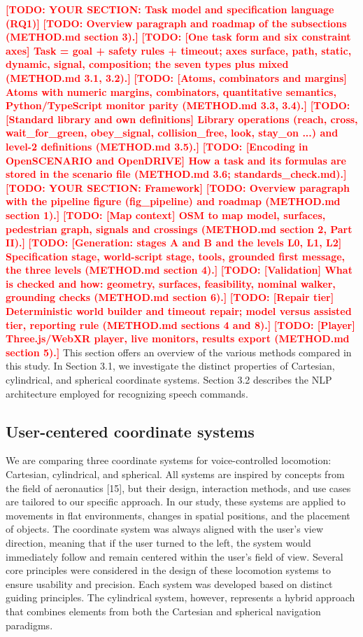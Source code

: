 \documentclass[preprint,12pt]{elsarticle}
\newcommand{\reftext}[1]{{\color{gray}#1}}   %
\newcommand{\todo}[1]{\textcolor{red}{\textbf{[TODO: #1]}}}
\begin{document}
\todo{YOUR SECTION: Task model and specification language (RQ1)}
\todo{Overview paragraph and roadmap of the subsections (METHOD.md section 3).}
\todo{[One task form and six constraint axes] Task = goal + safety rules + timeout; axes surface, path, static, dynamic, signal, composition; the seven types plus mixed (METHOD.md 3.1, 3.2).}
\todo{[Atoms, combinators and margins] Atoms with numeric margins, combinators, quantitative semantics, Python/TypeScript monitor parity (METHOD.md 3.3, 3.4).}
\todo{[Standard library and own definitions] Library operations (reach, cross, wait\_for\_green, obey\_signal, collision\_free, look, stay\_on ...) and level-2 definitions (METHOD.md 3.5).}
\todo{[Encoding in OpenSCENARIO and OpenDRIVE] How a task and its formulas are stored in the scenario file (METHOD.md 3.6; standards\_check.md).}
\todo{YOUR SECTION: Framework}
\todo{Overview paragraph with the pipeline figure (fig\_pipeline) and roadmap (METHOD.md section 1).}
\todo{[Map context] OSM to map model, surfaces, pedestrian graph, signals and crossings (METHOD.md section 2, Part II).}
\todo{[Generation: stages A and B and the levels L0, L1, L2] Specification stage, world-script stage, tools, grounded first message, the three levels (METHOD.md section 4).}
\todo{[Validation] What is checked and how: geometry, surfaces, feasibility, nominal walker, grounding checks (METHOD.md section 6).}
\todo{[Repair tier] Deterministic world builder and timeout repair; model versus assisted tier, reporting rule (METHOD.md sections 4 and 8).}
\todo{[Player] Three.js/WebXR player, live monitors, results export (METHOD.md section 5).}
\reftext{This section offers an overview of the various methods compared in this study. In Section 3.1, we investigate the distinct properties of Cartesian, cylindrical, and spherical coordinate systems. Section 3.2 describes the NLP architecture employed for recognizing speech commands.}

\subsection{User-centered coordinate systems}
\reftext{We are comparing three coordinate systems for voice-controlled locomotion: Cartesian, cylindrical, and spherical. All systems are inspired by concepts from the field of aeronautics [15], but their design, interaction methods, and use cases are tailored to our specific approach. In our study, these systems are applied to movements in flat environments, changes in spatial positions, and the placement of objects. The coordinate system was always aligned with the user's view direction, meaning that if the user turned to the left, the system would immediately follow and remain centered within the user's field of view. Several core principles were considered in the design of these locomotion systems to ensure usability and precision. Each system was developed based on distinct guiding principles. The cylindrical system, however, represents a hybrid approach that combines elements from both the Cartesian and spherical navigation paradigms.}
\end{document}
